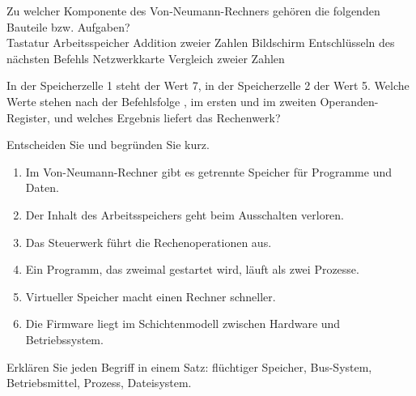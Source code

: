 \ueben
{}
Zu welcher Komponente des Von-Neumann-Rechners gehören die folgenden Bauteile bzw. Aufgaben? \\[1mm]
Tastatur \quad Arbeitsspeicher \quad Addition zweier Zahlen \quad Bildschirm \quad Entschlüsseln des nächsten Befehls \quad Netzwerkkarte \quad Vergleich zweier Zahlen

In der Speicherzelle 1 steht der Wert 7, in der Speicherzelle 2 der Wert 5. Welche Werte stehen nach der Befehlsfolge ,  im ersten und im zweiten Operanden-Register, und welches Ergebnis liefert das Rechenwerk?

Entscheiden Sie und begründen Sie kurz.
\begin{enumerate}[label=\alph*)]
\item Im Von-Neumann-Rechner gibt es getrennte Speicher für Programme und Daten.
\item Der Inhalt des Arbeitsspeichers geht beim Ausschalten verloren.
\item Das Steuerwerk führt die Rechenoperationen aus.
\item Ein Programm, das zweimal gestartet wird, läuft als zwei Prozesse.
\item Virtueller Speicher macht einen Rechner schneller.
\item Die Firmware liegt im Schichtenmodell zwischen Hardware und Betriebssystem.
\end{enumerate}

Erklären Sie jeden Begriff in einem Satz: flüchtiger Speicher, Bus-System, Betriebsmittel, Prozess, Dateisystem.
